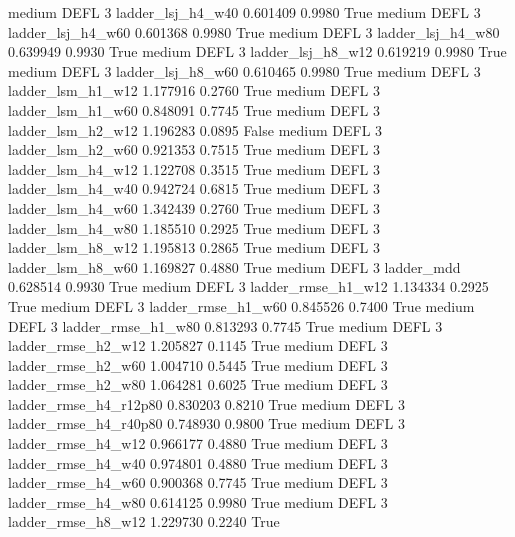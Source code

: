     medium     DEFL                 3      ladder_lsj_h4_w40   0.601409      0.9980    True
    medium     DEFL                 3      ladder_lsj_h4_w60   0.601368      0.9980    True
    medium     DEFL                 3      ladder_lsj_h4_w80   0.639949      0.9930    True
    medium     DEFL                 3      ladder_lsj_h8_w12   0.619219      0.9980    True
    medium     DEFL                 3      ladder_lsj_h8_w60   0.610465      0.9980    True
    medium     DEFL                 3      ladder_lsm_h1_w12   1.177916      0.2760    True
    medium     DEFL                 3      ladder_lsm_h1_w60   0.848091      0.7745    True
    medium     DEFL                 3      ladder_lsm_h2_w12   1.196283      0.0895   False
    medium     DEFL                 3      ladder_lsm_h2_w60   0.921353      0.7515    True
    medium     DEFL                 3      ladder_lsm_h4_w12   1.122708      0.3515    True
    medium     DEFL                 3      ladder_lsm_h4_w40   0.942724      0.6815    True
    medium     DEFL                 3      ladder_lsm_h4_w60   1.342439      0.2760    True
    medium     DEFL                 3      ladder_lsm_h4_w80   1.185510      0.2925    True
    medium     DEFL                 3      ladder_lsm_h8_w12   1.195813      0.2865    True
    medium     DEFL                 3      ladder_lsm_h8_w60   1.169827      0.4880    True
    medium     DEFL                 3             ladder_mdd   0.628514      0.9930    True
    medium     DEFL                 3     ladder_rmse_h1_w12   1.134334      0.2925    True
    medium     DEFL                 3     ladder_rmse_h1_w60   0.845526      0.7400    True
    medium     DEFL                 3     ladder_rmse_h1_w80   0.813293      0.7745    True
    medium     DEFL                 3     ladder_rmse_h2_w12   1.205827      0.1145    True
    medium     DEFL                 3     ladder_rmse_h2_w60   1.004710      0.5445    True
    medium     DEFL                 3     ladder_rmse_h2_w80   1.064281      0.6025    True
    medium     DEFL                 3  ladder_rmse_h4_r12p80   0.830203      0.8210    True
    medium     DEFL                 3  ladder_rmse_h4_r40p80   0.748930      0.9800    True
    medium     DEFL                 3     ladder_rmse_h4_w12   0.966177      0.4880    True
    medium     DEFL                 3     ladder_rmse_h4_w40   0.974801      0.4880    True
    medium     DEFL                 3     ladder_rmse_h4_w60   0.900368      0.7745    True
    medium     DEFL                 3     ladder_rmse_h4_w80   0.614125      0.9980    True
    medium     DEFL                 3     ladder_rmse_h8_w12   1.229730      0.2240    True
